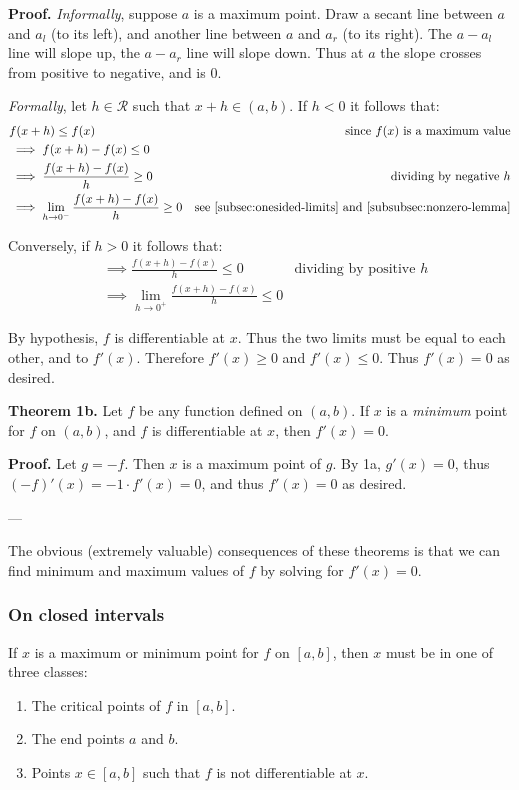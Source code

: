 \vs

\textbf{Proof.} \textit{Informally}, suppose $a$ is a maximum point.
Draw a secant line between $a$ and $a_l$ (to its left), and another
line between $a$ and $a_r$ (to its right). The $a-a_l$ line will slope
up, the $a-a_r$ line will slope down. Thus at $a$ the slope crosses
from positive to negative, and is $0$.

\vs

\textit{Formally}, let $h\in\mathcal{R}$ such that $x+h\in(a,b)$. If $h<0$ it follows that:
\begin{align*}
  &f(x+h)\leq f(x)&\text{since $f(x)$ is a maximum value}\\
  &\implies f(x+h)-f(x)\leq 0\\
  &\implies\frac{f(x+h)-f(x)}{h}\geq0&\text{dividing by negative $h$}\\
  &\implies \lim_{h\to0^-}\frac{f(x+h)-f(x)}{h}\geq0&\text{see
                                                 \ref{subsec:onesided-limits}
                                                 and
                                                 \ref{subsubsec:nonzero-lemma}}
\end{align*}

Conversely, if $h>0$ it follows that:
\begin{align*}
  &\implies \frac{f(x+h)-f(x)}{h}\leq0&\text{dividing by positive $h$}\\
  &\implies \lim_{h\to0^+}\frac{f(x+h)-f(x)}{h}\leq0
\end{align*}

By hypothesis, $f$ is differentiable at $x$. Thus the two limits must
be equal to each other, and to $f'(x)$. Therefore $f'(x)\geq0$ and
$f'(x)\leq0$. Thus $f'(x)=0$ as desired.

\vs

\textbf{Theorem 1b.} Let $f$ be any function defined on $(a,b)$. If
$x$ is a \textit{minimum} point for $f$ on $(a,b)$, and $f$ is
differentiable at $x$, then $f'(x)=0$.

\vs

\textbf{Proof.} Let $g=-f$. Then $x$ is a maximum point of $g$. By 1a,
$g'(x)=0$, thus $(-f)'(x)=-1\cdot f'(x)=0$, and thus $f'(x)=0$ as desired.

\vs---\vs

The obvious (extremely valuable) consequences of these theorems is
that we can find minimum and maximum values of $f$ by solving for
$f'(x)=0$.

\subsubsection*{On closed intervals}
If $x$ is a maximum or minimum point for $f$ on $[a,b]$, then $x$ must
be in one of three classes:
\begin{enumerate}
\item The critical points of $f$ in $[a,b]$.
\item The end points $a$ and $b$.
\item Points $x\in[a,b]$ such that $f$ is not differentiable at $x$.
\end{enumerate}

